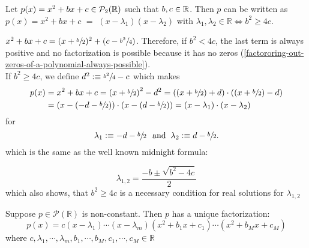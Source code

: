 \begin{thm} 
  Let $p(x)=x^2+bx+c \in \mathcal{P}_2(\mathbb{R})$ such that $b,c \in \mathbb{R}$. Then $p$ can be written as
  $p(x)=x^2 + bx + c$ $=$ $(x-\lambda_1)(x-\lambda_2)$ with $\lambda_1, \lambda_2 \in \mathbb{R} \iff b^2 \geq 4c$.
\end{thm}
\begin{prf}
  $x^2+bx+c=(x+\sfrac{b}{2})^2+(c-\sfrac{b^2}{4})$. Therefore, if $b^2<4c$, the last term is always positive and no factorization is possible because it has no zeros (\ref{factororing-out-zeros-of-a-polynomial-always-possible}). \\
  If $b^2 \geq 4c$, we define $d^2 :\equiv \sfrac{b^2}{4}-c$ which makes
  \begin{equation}
	  \begin{aligned}
	    p(x)&=x^2+bx+c
		  = \left (x+\sfrac{b}{2} \right )^2-d^2
		  = \left ( (x+\sfrac{b}{2}) +d \right) \cdot \left ( (x+\sfrac{b}{2}) - d \right) \\
		  &= \left (x-(-d -\sfrac{b}{2}) \right) \cdot \left (x-(d-\sfrac{b}{2})\right)
		  =\left(x-\lambda_1 \right) \cdot \left(x-\lambda_2\right)
	  \end{aligned}
  \end{equation}
  for 
  \begin{equation}
    \lambda_1 :\equiv -d-\sfrac{b}{2} \;\;\, \text{and}\;\; \lambda_2 :\equiv d-\sfrac{b}{2}.
  \end{equation}
  which is the same as the well known midnight formula:
  
  \begin{equation}
    \lambda_{1,2} = \frac{-b \pm \sqrt{b^2-4c}}{2}
  \end{equation}
  which also shows, that $b^2 \geq 4c$ is a necessary condition for real solutions for $\lambda_{1,2}$
  
\end{prf}

\begin{thm}
  Suppose $p \in \mathcal{P}(\mathbb{R})$ is non-constant. Then $p$ has a unique factorization:
  \begin{equation}
    p(x) = c(x-\lambda_1) \cdots (x-\lambda_m)(x^2+b_1x+c_1) \cdots (x^2+b_Mx+c_M)
  \end{equation}
  where $c, \lambda_1, \cdots, \lambda_m, b_1, \cdots, b_M, c_1, \cdots, c_M \in \mathbb{R}$
\end{thm}

